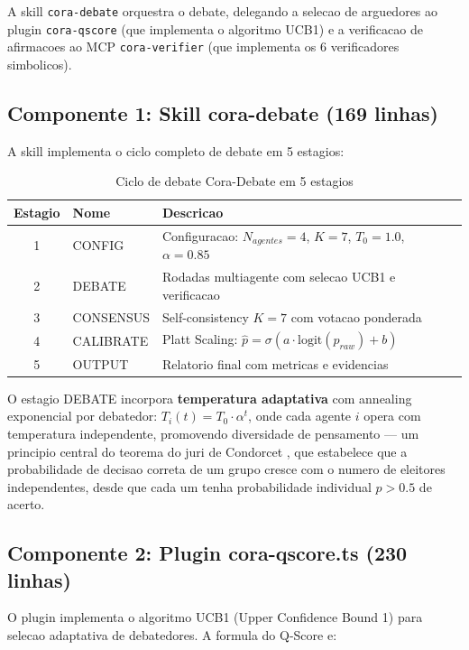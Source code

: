 \documentclass[5p]{elsarticle}
\begin{document}
A skill \texttt{cora-debate} orquestra o debate, delegando a selecao de arguedores ao plugin \texttt{cora-qscore} (que implementa o algoritmo UCB1) e a verificacao de afirmacoes ao MCP \texttt{cora-verifier} (que implementa os 6 verificadores simbolicos).

\subsection{Componente 1: Skill cora-debate (169 linhas)}

A skill implementa o ciclo completo de debate em 5 estagios:

\begin{table}[H]
\centering
\begin{tabular}{cll}
\toprule
\textbf{Estagio} & \textbf{Nome} & \textbf{Descricao} \\
\midrule
1 & CONFIG & Configuracao: $N_{agentes}=4$, $K=7$, $T_0=1.0$, $\alpha=0.85$ \\
2 & DEBATE & Rodadas multiagente com selecao UCB1 e verificacao \\
3 & CONSENSUS & Self-consistency $K=7$ com votacao ponderada \\
4 & CALIBRATE & Platt Scaling: $\hat{p} = \sigma(a \cdot \mathrm{logit}(p_{raw}) + b)$ \\
5 & OUTPUT & Relatorio final com metricas e evidencias \\
\bottomrule
\end{tabular}
\caption{Ciclo de debate Cora-Debate em 5 estagios}
\end{table}

O estagio DEBATE incorpora \textbf{temperatura adaptativa} com annealing exponencial por debatedor: $T_i(t) = T_0 \cdot \alpha^t$, onde cada agente $i$ opera com temperatura independente, promovendo diversidade de pensamento --- um principio central do teorema do juri de Condorcet \cite{condorcet1785}, que estabelece que a probabilidade de decisao correta de um grupo cresce com o numero de eleitores independentes, desde que cada um tenha probabilidade individual $p > 0.5$ de acerto.

\subsection{Componente 2: Plugin cora-qscore.ts (230 linhas)}

O plugin implementa o algoritmo UCB1 (Upper Confidence Bound 1) para selecao adaptativa de debatedores. A formula do Q-Score e:
\end{document}
